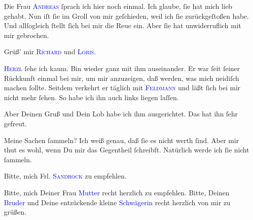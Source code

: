 \pstart
           Die Frau \textsc{\textcolor{blue}{Andreas}{}\ledrightnote{\textcolor{blue}{Lou Andreas-Salomé}}} ſprach ich hier noch einmal. Ich glaube, ſie hat mich lieb gehabt. Nun iſt ſie
               im Groll von mir geſchieden, weil ich ſie zurückgeſtoßen habe. Und allſogleich ſtellt
                  {\pb}ſich bei mir die Reue ein. Aber ſie hat
               unwiderruflich mit mir gebrochen.\pend
           
\pstart
           Grüß’ mir \textsc{\textcolor{blue}{Richard}{}\ledrightnote{\textcolor{blue}{Richard Beer-Hofmann}}} und \textsc{\textcolor{blue}{Loris}{}\ledrightnote{\textcolor{blue}{Hugo von Hofmannsthal}}}.\pend
           
\pstart
           \textsc{\textcolor{blue}{Herzl}{}\ledrightnote{\textcolor{blue}{Theodor Herzl}}} ſehe ich kaum. Bin wieder ganz mit ihm auseinander. Er war ſeit ſeiner
               Rückkunft einmal bei mir, um mir anzuzeigen, daß \label{K_L02616-19v}\label{K_L02616-19h} werden, was
               mich neidiſch machen ſollte. Seitdem verkehrt er täglich mit \textsc{\textcolor{blue}{Feldmann}{}\ledrightnote{\textcolor{blue}{Siegmund Feldmann}}} und läßt ſich bei mir nicht mehr ſehen. So habe ich ihn auch links liegen
               laſſen.\pend
           
\pstart
           Aber Deinen Gruß und {\pb}Dein Lob habe ich ihm
               ausgerichtet. Das hat ihn ſehr gefreut.\pend
           
\pstart
           Meine Sachen ſammeln? Ich weiß genau, daß ſie es nicht werth ſind. Aber mir thut es
               wohl, wenn Du mir das Gegentheil ſchreibſt. Natürlich werde ich ſie nicht
               ſammeln.\pend
           
\pstart
           Bitte, mich Frl. \textsc{\textcolor{blue}{Sandrock}{}\ledrightnote{\textcolor{blue}{Adele Sandrock}}} zu empfehlen.\pend
           
\pstart
           Bitte, mich Deiner Frau \textcolor{blue}{Mutter}{}\ledrightnote{{$\rightarrow$}\textcolor{blue}{Louise Schnitzler}} recht herzlich zu empfehlen. Bitte, Deinen \textcolor{blue}{Bruder}{}\ledrightnote{{$\rightarrow$}\textcolor{blue}{Julius Schnitzler}} und Deine entzückende kleine \textcolor{blue}{Schwägerin}{}\ledrightnote{{$\rightarrow$}\textcolor{blue}{Helene Schnitzler}} recht herzlich von
               mir zu grüßen.\pend
           
